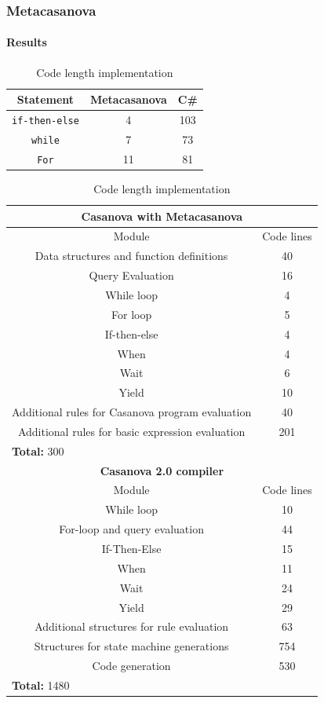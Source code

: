 \documentclass[10pt,a4paper]{beamer}
\begin{document}
\begin{frame}
\frametitle{Metacasanova}
\framesubtitle{Results}

\begin{table}
	\centering
	\tiny
	\caption{Code length implementation}
	\begin{tabular}{|c|c|c|}
		\hline
		\textbf{Statement} & \textbf{Metacasanova} & \textbf{C\#}\\
		\hline
		\texttt{if-then-else} & 4 & 103 \\
		\hline
		\texttt{while} & 7 & 73 \\
		\hline
		\texttt{For} & 11 & 81\\
		\hline
	\end{tabular}

	\begin{tabular}{|c|c|}
		\hline
		\multicolumn{2}{|c|}{\textbf{Casanova with Metacasanova}} \\
		\hline
		Module & Code lines \\
		\hline
		Data structures and function definitions & 40 \\
		\hline
		Query Evaluation & 16 \\
		\hline
		While loop & 4 \\
		\hline
		For loop & 5 \\
		\hline
		If-then-else & 4 \\
		\hline
		When & 4 \\
		\hline
		Wait & 6 \\
		\hline
		Yield & 10 \\
		\hline
		Additional rules for Casanova program evaluation & 40 \\
		\hline
		Additional rules for basic expression evaluation & 201 \\
		\hline
		\multicolumn{2}{|l|}{\textbf{Total: } 300} \\
		\hline
		\multicolumn{2}{|c|}{\textbf{Casanova 2.0 compiler}} \\
		\hline
		Module & Code lines \\
		\hline
		While loop & 10 \\
		\hline
		For-loop and query evaluation & 44 \\
		\hline
		If-Then-Else & 15 \\
		\hline
		When & 11 \\
		\hline
		Wait & 24 \\
		\hline
		Yield & 29 \\
		\hline
		Additional structures for rule evaluation & 63 \\
		\hline
		Structures for state machine generations & 754 \\
		\hline
		Code generation & 530 \\
		\hline
		\multicolumn{2}{|l|}{\textbf{Total: } 1480} \\
		\hline			
	\end{tabular}
\end{table}
\end{frame}
\end{document}

